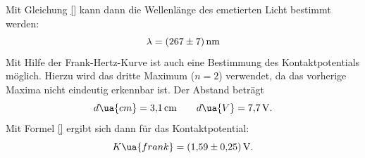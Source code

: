 Mit Gleichung \eqref{} kann dann die Wellenlänge des emetierten Licht bestimmt werden:
\begin{equation}
  \label{eq: lambda}
  \lambda=\SI{267\pm7}{\nano\meter}
\end{equation}
Mit Hilfe der Frank-Hertz-Kurve ist auch eine Bestimmung des Kontaktpotentials
möglich. Hierzu wird das dritte Maximum ($n=2$) verwendet, da das vorherige Maxima
nicht eindeutig erkennbar ist. Der Abstand beträgt
\begin{equation*}
  d\ua{cm}=\SI{3.1}{\centi\meter} \qquad d\ua{V}=\SI{7.7}{\volt}.
\end{equation*}
Mit Formel \eqref{} ergibt sich dann für das Kontaktpotential:
\begin{equation}
  \label{eq:k_frank}
  K\ua{frank}= \SI{1.59\pm0.25}{\volt}.
\end{equation}
\FloatBarrier

